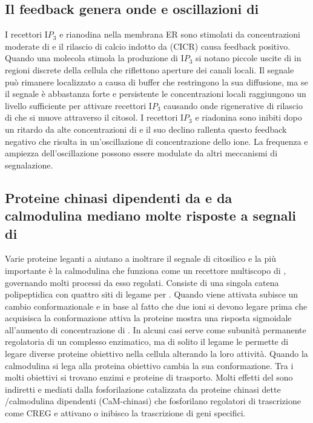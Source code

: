 \subsection{Il feedback genera onde e oscillazioni di }
I recettori I$P_3$ e rianodina nella membrana ER sono stimolati da concentrazioni moderate di  e il rilascio di calcio indotto da  (CICR) causa feedback positivo.
Quando una molecola stimola la produzione di I$P_3$ si notano piccole uscite di  in regioni discrete della cellula che riflettono aperture dei canali locali. Il segnale pu\`o
rimanere localizzato a causa di buffer che restringono la sua diffusione, ma se il segnale \`e abbastanza forte e persistente le concentrazioni locali raggiungono un livello sufficiente
per attivare recettori I$P_3$ causando onde rigenerative di rilascio di  che si muove attraverso il citosol. I recettori I$P_3$ e riadonina sono inibiti dopo un ritardo da
alte concentrazioni di  e il suo declino rallenta questo feedback negativo che risulta in un'oscillazione di concentrazione dello ione. La frequenza e  ampiezza 
dell'oscillazione possono essere modulate da altri meccanismi di segnalazione. 
\subsection{Proteine chinasi dipendenti da  e da calmodulina mediano molte risposte a segnali di }
Varie proteine leganti a  aiutano a inoltrare il segnale di  citosilico e la pi\`u importante \`e la calmodulina che funziona come un recettore multiscopo di
, governando molti processi da esso regolati. Consiste di una singola catena polipeptidica con quattro siti di legame per . Quando viene attivata subisce un 
cambio conformazionale e in base al fatto che due ioni si devono legare prima che acquisisca la conformazione attiva la proteine mostra una risposta sigmoidale all'aumento di 
concentrazione di . In alcuni casi serve come subunit\`a permanente regolatoria di un complesso enzimatico, ma di solito il legame le permette di legare diverse proteine
obiettivo nella cellula alterando la loro attivit\`a. Quando la calmodulina si lega alla proteina obiettivo cambia la sua conformazione. Tra i molti obiettivi si trovano enzimi e 
proteine di trasporto. Molti effetti del  sono indiretti e mediati dalla fosforilazione catalizzata da proteine chinasi dette /calmodulina dipendenti 
(CaM-chinasi) che fosforilano regolatori di trascrizione come CREG e attivano o inibisco la trascrizione di geni specifici. 

